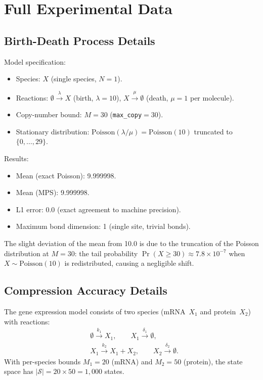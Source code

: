 \documentclass[11pt]{article}
\newcommand{\calS}{\mathcal{S}}
\begin{document}
\section{Full Experimental Data}\label{app:experiments}

\subsection{Birth-Death Process Details}

Model specification:
\begin{itemize}[itemsep=1pt]
\item Species: $X$ (single species, $N=1$).
\item Reactions: $\emptyset \xrightarrow{\lambda} X$ (birth, $\lambda = 10$),
  $X \xrightarrow{\mu} \emptyset$ (death, $\mu = 1$ per molecule).
\item Copy-number bound: $M = 30$ (\texttt{max\_copy}${}=30$).
\item Stationary distribution: $\mathrm{Poisson}(\lambda/\mu) = \mathrm{Poisson}(10)$
  truncated to $\{0,\ldots,29\}$.
\end{itemize}

Results:
\begin{itemize}[itemsep=1pt]
\item Mean (exact Poisson): 9.999998.
\item Mean (MPS): 9.999998.
\item L1 error: 0.0 (exact agreement to machine precision).
\item Maximum bond dimension: 1 (single site, trivial bonds).
\end{itemize}

The slight deviation of the mean from 10.0 is due to the truncation
of the Poisson distribution at $M=30$: the tail probability
$\Pr(X \geq 30) \approx 7.8 \times 10^{-7}$ when $X \sim \text{Poisson}(10)$
is redistributed, causing a negligible shift.

\subsection{Compression Accuracy Details}

The gene expression model consists of two species (mRNA~$X_1$ and
protein~$X_2$) with reactions:
\begin{align}
  &\emptyset \xrightarrow{k_1} X_1, \qquad
  X_1 \xrightarrow{\delta_1} \emptyset, \nonumber\\
  &X_1 \xrightarrow{k_2} X_1 + X_2, \qquad
  X_2 \xrightarrow{\delta_2} \emptyset. \nonumber
\end{align}
With per-species bounds $M_1 = 20$ (mRNA) and $M_2 = 50$ (protein),
the state space has $|\calS| = 20 \times 50 = 1{,}000$ states.
\end{document}
